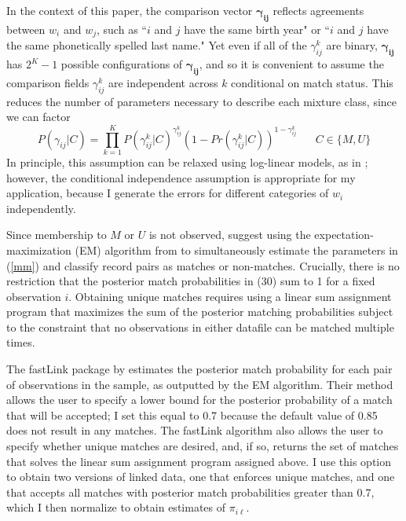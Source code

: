 \documentclass[12pt]{article}
\newcommand\gamij{\mathbf{\gamma_{ij}}}
\begin{document}
In the context of this paper, the comparison vector $\gamij$ reflects agreements between $w_i$ and $w_j$, such as ``$i$ and $j$ have the same birth year" or ``$i$ and $j$ have the same phonetically spelled last name."  Yet even if all of the $\gamma_{ij}^{k}$ are binary, $\gamij$ has $2^K -1$ possible configurations of $\gamij$, and so it is convenient to assume the comparison fields $\gamma_{ij}^{k}$ are independent across $k$ conditional on match status.  This reduces the number of parameters necessary to describe each mixture class, since we can factor 
 \begin{equation} 
 P(\gamma_{ij} | C) = \prod_{k=1}^K P(\gamma_{ij}^{k} | C)^{\gamma_{ij}^{k}}(1-Pr(\gamma_{ij}^{k} | C))^{1-\gamma_{ij}^{k}} \hspace{20pt} C\in \{M, U\} 
 \label{eq:condInd}
 \end{equation}
In principle, this assumption can be relaxed using log-linear models, as in \cite{larsen_rubin_2001}; however, the conditional independence assumption is appropriate for my application, because I generate the errors for different categories of $w_i$ independently. 
 
Since membership to $M$ or $U$ is not observed, \cite{larsen_rubin_2001} suggest using the expectation-maximization (EM) algorithm from \citet*{em} to simultaneously estimate the parameters in (\ref{mm}) and classify record pairs as matches or non-matches.  Crucially, there is no restriction that the posterior match probabilities in (30) sum to 1 for a fixed observation $i$.  Obtaining unique matches requires using a linear sum assignment program that maximizes the sum of the posterior matching probabilities subject to the constraint that no observations in either datafile can be matched multiple times. 

The fastLink package by \citet*{enamorado2019} estimates the posterior match probability for each pair of observations in the sample, as outputted by the EM algorithm.  Their method allows the user to specify a lower bound for the posterior probability of a match that will be accepted; I set this equal to 0.7 because the default value of 0.85 does not result in any matches.   The fastLink algorithm also allows the user to specify whether unique matches are desired, and, if so, returns the set of matches that solves the linear sum assignment program assigned above.  I use this option to obtain two versions of linked data, one that enforces unique matches, and one that accepts all matches with posterior match probabilities greater than 0.7, which I then normalize to obtain estimates of $\pi_{i\ell}$. 
\end{document}
